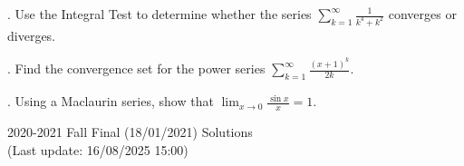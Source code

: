\documentclass{article}
\begin{document}
\hfill

. Use the Integral Test to determine whether the series $\displaystyle\sum_{k=1}^{\infty}\frac1{k^4+k^2}$ converges or diverges.

\hfill

\hfill

. Find the convergence set for the power series  $\displaystyle\sum_{k=1}^\infty\frac{(x+1)^k}{2k}.$

\hfill

\hfill

. Using a Maclaurin series, show that $\displaystyle\lim_{x\to0}\frac{\sin x}x=1$.

\newpage

\begin{center}
2020-2021 Fall Final (18/01/2021) Solutions\\
(Last update: 16/08/2025 15:00)
\end{center}
\end{document}
